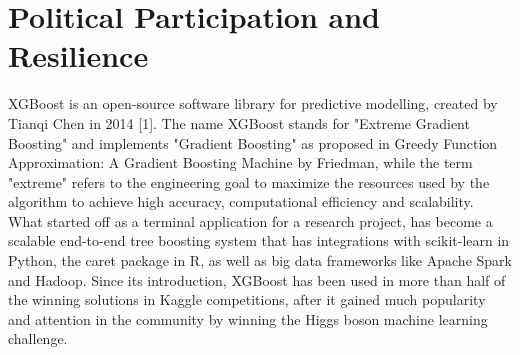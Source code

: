 \section{Political Participation and Resilience}

XGBoost is an open-source software library for predictive modelling, created by Tianqi Chen in 2014 [1]. The name XGBoost stands for "Extreme Gradient Boosting" and implements "Gradient Boosting" as proposed in Greedy Function Approximation: A Gradient Boosting Machine by Friedman, while the term "extreme" refers to the engineering goal to maximize the resources used by the algorithm to achieve high accuracy, computational efficiency and scalability. What started off as a terminal application for a research project, has become a scalable end-to-end tree boosting system that has integrations with scikit-learn in Python, the caret package in R, as well as big data frameworks like Apache Spark and Hadoop. Since its introduction, XGBoost has been used in more than half of the winning solutions in Kaggle competitions, after it gained much popularity and attention in the community by winning the Higgs boson machine learning challenge.
